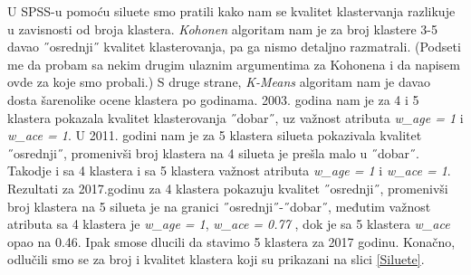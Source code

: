 \documentclass[a4paper]{article}
\begin{document}
U SPSS-u pomoću siluete smo pratili kako nam se kvalitet klastervanja razlikuje u zavisnosti od broja klastera. 
\textit{Kohonen} algoritam nam je za broj klastere 3-5 davao ˝osrednji˝ kvalitet klasterovanja, pa ga nismo detaljno razmatrali. {\color{red} (Podseti me da probam sa nekim drugim ulaznim argumentima za Kohonena i da napisem ovde za koje smo probali.)} S druge strane, \textit{K-Means} algoritam nam je davao dosta šarenolike ocene klastera po godinama. 2003. godina nam je za 4 i 5 klastera pokazala kvalitet klasterovanja  ˝dobar˝, uz važnost atributa \textit{w\_age = 1} i \textit{w\_ace = 1}. U 2011. godini nam je za 5 klastera silueta pokazivala kvalitet ˝osrednji˝, promenivši broj klastera na 4 silueta je prešla malo u ˝dobar˝. Takodje i sa 4 klastera i sa 5 klastera važnost atributa \textit{w\_age = 1} i \textit{w\_ace = 1}. Rezultati za 2017.godinu za 4 klastera pokazuju kvalitet ˝osrednji˝, promenivši broj klastera na 5 silueta je na granici ˝osrednji˝-˝dobar˝, međutim važnost atributa sa 4 klastera je \textit{w\_age = 1}, \textit{w\_ace = 0.77} , dok je sa 5 klastera \textit{w\_ace} opao na 0.46. Ipak smose dlucili da stavimo 5 klastera za 2017 godinu. Konačno, odlučili smo se za broj i kvalitet klastera koji su prikazani na slici \ref{Siluete}.
\end{document}
